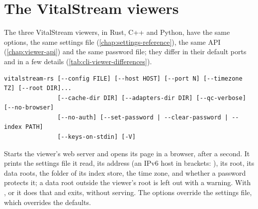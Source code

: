 \section{The VitalStream viewers}
\label{sec:cli-vitalstream}

The three VitalStream viewers, in Rust, C++ and Python, have the same options, the same settings
file (\cref{chap:settings-reference}), the same API (\cref{chap:viewer-api}) and the same password
file; they differ in their default ports and in a few details
(\cref{tab:cli-viewer-differences}).

\begin{lstlisting}[style=signature]
vitalstream-rs [--config FILE] [--host HOST] [--port N] [--timezone TZ] [--root DIR]...
               [--cache-dir DIR] [--adapters-dir DIR] [--qc-verbose] [--no-browser]
               [--no-auth] [--set-password | --clear-password | --index PATH]
               [--keys-on-stdin] [-V]
\end{lstlisting}
Starts the viewer's web server and opens its page in a browser, after a second. It prints the
settings file it read, its address (an IPv6 host in brackets: ), its
root, its data roots, the folder of its index store, the time zone, and whether a password protects it; a data root outside the viewer's root is left out with a warning. With
,  or  it does that and exits,
without serving. The options override the settings file, which overrides the defaults.
